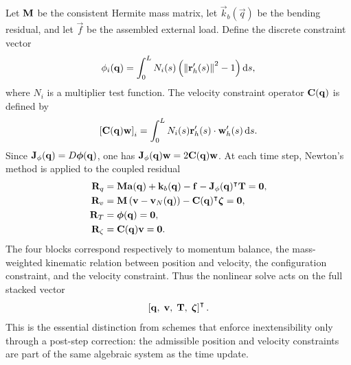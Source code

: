 Let \(\mathbf{M}\) be the consistent Hermite mass matrix, let \(\vec k_b(\vec q)\)
be the bending residual, and let \(\vec f\) be the assembled external load.
Define the discrete constraint vector
\begin{equation}\label{eq:ggl-discrete-position-constraint}
    \phi_i(\vec q)
    =
    \int_0^L N_i(s)
    \left(\norm{\vec r_h'(s)}^2-1\right)
    \odif{s},
\end{equation}
where \(N_i\) is a multiplier test function. The velocity constraint operator
\(\mathbf{C}(\mathbf{q})\) is defined by
\begin{equation}\label{eq:ggl-discrete-velocity-operator}
    \left[\mat C(\vec q)\vec w\right]_i
    =
    \int_0^L
    N_i(s)\vec r_h'(s)\cdot\vec w_h'(s)
    \odif{s}.
\end{equation}
Since \(\mathbf{J}_\phi(\mathbf{q})=D\bm\phi(\mathbf{q})\), one has
\(\mathbf{J}_\phi(\mathbf{q})\mathbf{w} = 2\mathbf{C}(\mathbf{q})\mathbf{w}\). At each time step,
Newton's method is applied to the coupled residual
\begin{align}
    \mathbf{R}_q
     & =
    \mathbf{M}\mathbf{a}(\mathbf{q})
    +
    \mathbf{k}_b(\mathbf{q})
    -
    \mathbf{f}
    -
    \mathbf{J}_\phi(\mathbf{q})^\intercal\mathbf{T}
    =
    \mathbf{0},
    \label{eq:ggl-residual-q}      \\
    \mathbf{R}_v
     & =
    \mathbf{M}\left(\mathbf{v}-\mathbf{v}_N(\mathbf{q})\right)
    -
    \mathbf{C}(\mathbf{q})^\intercal\bm\zeta
    =
    \mathbf{0},
    \label{eq:ggl-residual-v}      \\
    \mathbf{R}_T
     & =
    \bm\phi(\mathbf{q})
    =
    \mathbf{0},
    \label{eq:ggl-residual-t}      \\
    \mathbf{R}_\zeta
     & =
    \mathbf{C}(\mathbf{q})\mathbf{v}
    =
    \mathbf{0}.
    \label{eq:ggl-residual-zeta}
\end{align}
The four blocks correspond respectively to momentum balance, the mass-weighted
kinematic relation between position and velocity, the configuration constraint,
and the velocity constraint. Thus the nonlinear solve acts on the full stacked
vector
\begin{equation*}
    \left[
        \mathbf{q},\;
        \mathbf{v},\;
        \mathbf{T},\;
        \bm\zeta
        \right]^\intercal .
\end{equation*}
This is the essential distinction from schemes that enforce inextensibility
only through a post-step correction: the admissible position and velocity
constraints are part of the same algebraic system as the time update.

